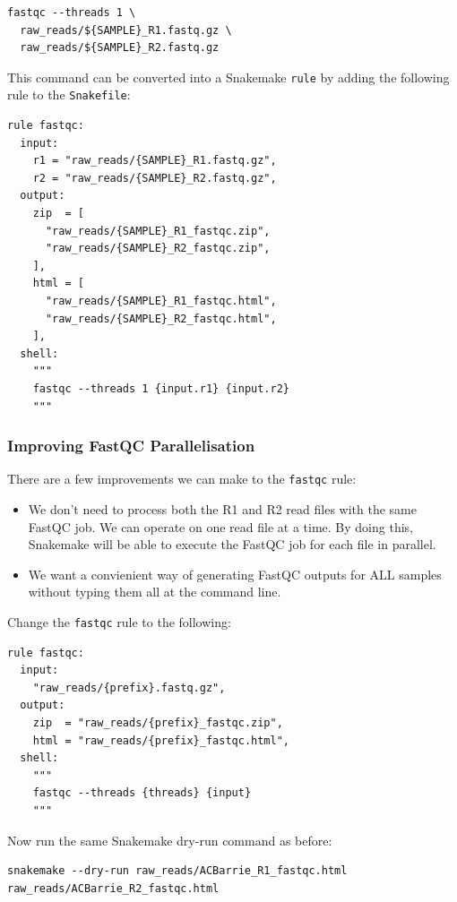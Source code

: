 \begin{lstlisting}
fastqc --threads 1 \
  raw_reads/${SAMPLE}_R1.fastq.gz \
  raw_reads/${SAMPLE}_R2.fastq.gz
\end{lstlisting}

This command can be converted into a Snakemake \texttt{rule} by adding the following rule to the \texttt{Snakefile}:

\begin{lstlisting}
rule fastqc:
  input:
    r1 = "raw_reads/{SAMPLE}_R1.fastq.gz",
    r2 = "raw_reads/{SAMPLE}_R2.fastq.gz",
  output:
    zip  = [
      "raw_reads/{SAMPLE}_R1_fastqc.zip",
      "raw_reads/{SAMPLE}_R2_fastqc.zip",
    ],
    html = [
      "raw_reads/{SAMPLE}_R1_fastqc.html",
      "raw_reads/{SAMPLE}_R2_fastqc.html",
    ],
  shell:
    """
    fastqc --threads 1 {input.r1} {input.r2}
    """
\end{lstlisting}

\subsubsection{Improving FastQC Parallelisation}

There are a few improvements we can make to the \texttt{fastqc} rule:

\begin{itemize}
  \item We don't need to process both the R1 and R2 read files with the same FastQC job.
	We can operate on one read file at a time.
        By doing this, Snakemake will be able to execute the FastQC job for each file in parallel.
  \item We want a convienient way of generating FastQC outputs for ALL samples without typing them all at the command line.
\end{itemize}

Change the \texttt{fastqc} rule to the following:

\begin{lstlisting}
rule fastqc:
  input:
    "raw_reads/{prefix}.fastq.gz",
  output:
    zip  = "raw_reads/{prefix}_fastqc.zip",
    html = "raw_reads/{prefix}_fastqc.html",
  shell:
    """
    fastqc --threads {threads} {input}
    """
\end{lstlisting}

Now run the same Snakemake dry-run command as before:

\begin{lstlisting}
snakemake --dry-run raw_reads/ACBarrie_R1_fastqc.html raw_reads/ACBarrie_R2_fastqc.html
\end{lstlisting}

